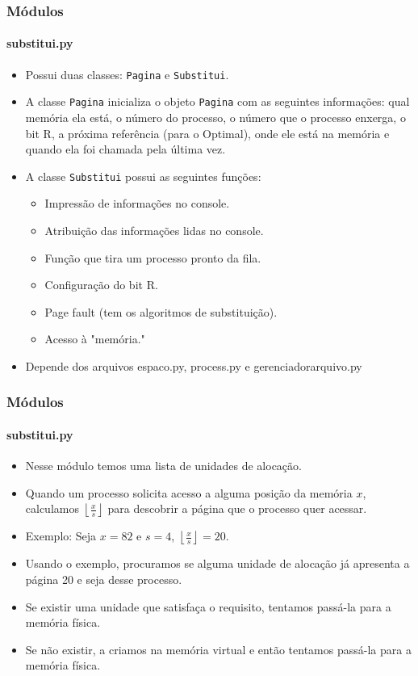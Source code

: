 \documentclass{beamer}
\begin{document}
\begin{frame}
	\frametitle{Módulos}
	\framesubtitle{substitui.py}
	\begin{itemize}
		\item Possui duas classes: \texttt{Pagina} e \texttt{Substitui}.
		\item A classe \texttt{Pagina} inicializa o objeto \texttt{Pagina} com as seguintes informações: qual memória ela está, o número do processo, o número que o processo enxerga, o bit R, a próxima referência (para o Optimal), onde ele está na memória e quando ela foi chamada pela última vez.
		\item A classe \texttt{Substitui} possui as seguintes funções:
		\begin{itemize}
			\item Impressão de informações no console.
			\item Atribuição das informações lidas no console.
			\item Função que tira um processo pronto da fila.
			\item Configuração do bit R.
			\item Page fault (tem os algoritmos de substituição).
			\item Acesso à "memória."
		\end{itemize}
		\item Depende dos arquivos espaco.py, process.py e gerenciador\textunderscore arquivo.py
	\end{itemize}
\end{frame}

\begin{frame}
	\frametitle{Módulos}
	\framesubtitle{substitui.py}
	\begin{itemize}
		\item Nesse módulo temos uma lista de unidades de alocação.
		\item Quando um processo solicita acesso a alguma posição da memória $x$, calculamos $\left \lfloor{\frac{x}{s}}\right \rfloor$ para descobrir a página que o processo quer acessar.
		\item Exemplo: Seja $x = 82$ e $s = 4$, $\left \lfloor{\frac{x}{s}}\right \rfloor = 20$. 
		\item Usando o exemplo, procuramos se alguma unidade de alocação já apresenta a página 20 e seja desse processo.
		\item Se existir uma unidade que satisfaça o requisito, tentamos passá-la para a memória física.
		\item Se não existir, a criamos na memória virtual e então tentamos passá-la para a memória física.
	\end{itemize}
\end{frame}
\end{document}
